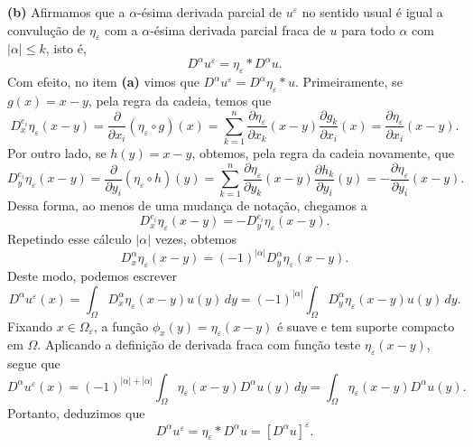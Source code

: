 \documentclass[a4paper, 11pt]{book}
\theoremstyle{definition}
\begin{document}
\begin{prf}
    \textbf{(b)} Afirmamos que a $\alpha$-ésima derivada parcial de $u^\varepsilon$ no sentido usual é igual a convulução de $\eta_\varepsilon$ com a $\alpha$-ésima derivada parcial fraca de $u$ para todo $\alpha$ com $|\alpha| \leqslant k$, isto é,
    \[
        D^\alpha u^\varepsilon = \eta_\varepsilon * D^\alpha u.
    \]
    Com efeito, no item \textbf{(a)} vimos que $D^\alpha u^\varepsilon = D^\alpha \eta_\varepsilon * u$. Primeiramente, se $g(x) = x - y$, pela regra da cadeia, temos que
    \[
        D^{e_i}_x \eta_\varepsilon (x -y) = \dfrac{\partial}{\partial x_i} (\eta_\varepsilon \circ g)(x) = \sum_{k=1}^n \dfrac{\partial \eta_\varepsilon}{\partial x_k} (x - y) \dfrac{\partial g_k}{\partial x_i}(x) = \dfrac{\partial \eta_\varepsilon}{\partial x_i}(x-y).
    \]
    Por outro lado, se $h(y) = x - y$, obtemos, pela regra da cadeia novamente, que
    \[
        D^{e_i}_y \eta_\varepsilon (x-y) = \dfrac{\partial}{\partial y_i} (\eta_\varepsilon \circ h)(y) = \sum_{k=1}^n \dfrac{\partial \eta_\varepsilon}{\partial y_k} (x - y) \dfrac{\partial h_k}{\partial y_i}(y) = -\dfrac{\partial \eta_\varepsilon}{\partial y_i}(x-y).
    \]
    Dessa forma, ao menos de uma mudança de notação, chegamos a
    \[
        D^{e_i}_x \eta_\varepsilon (x-y) = -D^{e_i}_y \eta_\varepsilon (x-y).
    \]
    Repetindo esse cálculo $|\alpha|$ vezes, obtemos
    \[
        D^\alpha_x \eta_\varepsilon (x-y) = (-1)^{|\alpha|} D^\alpha_y \eta_\varepsilon (x-y).
    \]
    Deste modo, podemos escrever
    \[
        D^{\alpha} u^\varepsilon (x) = \int_\Omega D^\alpha_x \eta_\varepsilon (x-y) u(y) \,dy = (-1)^{|\alpha|} \int_\Omega D^{\alpha}_y \eta_\varepsilon (x-y) u(y) \,dy.
    \]
    Fixando $x \in \Omega_\varepsilon$, a função $\phi_x(y) =\eta_\varepsilon(x-y)$ é suave e tem suporte compacto em $\Omega$.
    Aplicando a definição de derivada fraca com função teste $\eta_\varepsilon(x-y)$, segue que
    \[
        D^\alpha u^\varepsilon(x) = (-1)^{|\alpha| + |\alpha|}  \int_\Omega \eta_\varepsilon(x-y) D^{\alpha} u(y) \,dy = \int_\Omega \eta_\varepsilon(x-y) D^\alpha u(y).
    \]
    Portanto, deduzimos que
    \begin{equation}
        D^\alpha u^\varepsilon = \eta_\varepsilon * D^\alpha u = [D^\alpha u]^\varepsilon.
    \end{equation}


\end{prf}
\end{document}
